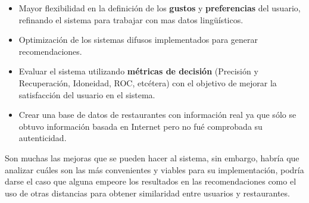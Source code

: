 \documentclass[12pt,letterpaper,oneside] {memoir}
\begin{document}
\begin{itemize}
\item Mayor flexibilidad en la definición de los \textbf{gustos} y \textbf{preferencias} del usuario, refinando el sistema para trabajar con mas datos lingüísticos.
\item Optimización de los sistemas difusos implementados para generar recomendaciones.
\item Evaluar el sistema utilizando \textbf{métricas de decisión} (Precisión y Recuperación, Idoneidad, ROC, etcétera) con el objetivo de mejorar la satisfacción del usuario en el sistema.
\item Crear una base de datos de restaurantes con información real ya que sólo se obtuvo información basada en Internet pero no fué comprobada su autenticidad.
\end{itemize}
Son muchas las mejoras que se pueden hacer al sistema, sin embargo, habría que analizar cuáles son las más convenientes y viables para su implementación, podría darse el caso que alguna empeore los resultados en las recomendaciones como el uso de otras distancias para obtener similaridad entre usuarios y restaurantes.
\end{document}
